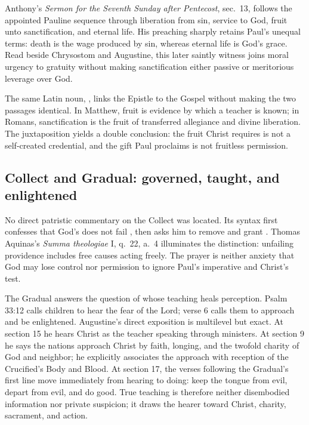 Anthony's \emph{Sermon for the Seventh Sunday after Pentecost}, sec.~13, follows the appointed Pauline sequence through liberation from sin, service to God, fruit unto sanctification, and eternal life. His preaching sharply retains Paul's unequal terms: death is the wage produced by sin, whereas eternal life is God's grace. Read beside Chrysostom and Augustine, this later saintly witness joins moral urgency to gratuity without making sanctification either passive or meritorious leverage over God.

The same Latin noun, , links the Epistle to the Gospel without making the two passages identical. In Matthew, fruit is evidence by which a teacher is known; in Romans, sanctification is the fruit of transferred allegiance and divine liberation. The juxtaposition yields a double conclusion: the fruit Christ requires is not a self-created credential, and the gift Paul proclaims is not fruitless permission.

\sectionguard
\subsection*{Collect and Gradual: governed, taught, and enlightened\enspace{}}

No direct patristic commentary on the Collect was located. Its syntax first confesses that God's  does not fail , then asks him to remove  and grant . Thomas Aquinas's \emph{Summa theologiae} I, q.~22, a.~4 illuminates the distinction: unfailing providence includes free causes acting freely. The prayer is neither anxiety that God may lose control nor permission to ignore Paul's imperative and Christ's test.

The Gradual answers the question of whose teaching heals perception. Psalm 33:12 calls children to hear the fear of the Lord; verse 6 calls them to approach and be enlightened. Augustine's direct exposition is multilevel but exact. At section 15 he hears Christ as the teacher speaking through ministers. At section 9 he says the nations approach Christ by faith, longing, and the twofold charity of God and neighbor; he explicitly associates the approach with reception of the Crucified's Body and Blood. At section 17, the verses following the Gradual's first line move immediately from hearing to doing: keep the tongue from evil, depart from evil, and do good. True teaching is therefore neither disembodied information nor private suspicion; it draws the hearer toward Christ, charity, sacrament, and action.

